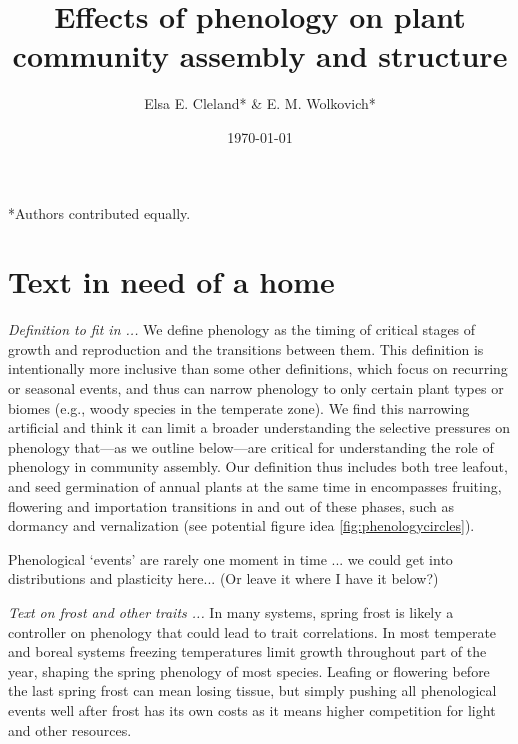 \documentclass[11pt]{article}
\begin{document}

\renewcommand{\refname}{\CHead{}}

\title{Effects of phenology on plant community assembly and structure }
\author{Elsa E. Cleland* \& E. M. Wolkovich*}
\date{\today}
\maketitle
\tableofcontents


\setlength{\parindent}{0cm}
\setlength{\parskip}{5pt}
*Authors contributed equally.


\section{Text in need of a home}

\emph{Definition to fit in ...} 
We define phenology as the timing of critical stages of growth and reproduction and the transitions between them. This definition is intentionally more inclusive than some other definitions, which focus on recurring or seasonal events, and thus can narrow phenology to only certain plant types or biomes (e.g., woody species in the temperate zone). We find this narrowing artificial and think it can limit a broader understanding the selective pressures on phenology that---as we outline below---are critical for understanding the role of phenology in community assembly. Our definition thus includes both tree leafout, and seed germination of annual plants at the same time in encompasses fruiting, flowering and importation transitions in and out of these phases, such as dormancy and vernalization (see potential figure idea \ref{fig:phenologycircles}).

Phenological `events' are rarely one moment in time ... we could get into distributions and plasticity here... (Or leave it where I have it below?)

\emph{Text on frost and other traits ...} 
In many systems, spring frost is likely a controller on phenology that could lead to trait correlations. In most temperate and boreal systems freezing temperatures limit growth throughout part of the year, shaping the spring phenology of most species. Leafing or flowering before the last spring frost can mean losing tissue, but simply pushing all phenological events well after frost has its own costs as it means higher competition for light and other resources. 
\end{document}
